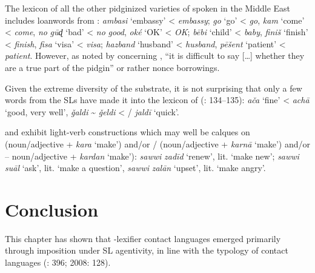 \documentclass[output=paper]{langsci/langscibook}
\begin{document}
  The lexicon of all the other pidginized varieties of  spoken in the Middle East includes {loanwords} from :  \textit{ambasi} `embassy' <  \textit{embassy}; \textit{go} `go' <  \textit{go}, \textit{kam} `come' <  \textit{come}, \textit{no} \textit{gūɖ} ‘bad’ <  \textit{no} \textit{good}, \textit{oké} `OK' <  \textit{OK};   \textit{bēbi} ‘child’ <  \textit{baby}, \textit{finiš} ‘finish’ <  \textit{finish}, \textit{fisa} ‘visa’ <  \textit{visa};  \textit{hazband} `husband' <  \textit{husband}, \textit{pēšent} ‘patient’ <  \textit{patient}. However, as noted by \citet[113]{Smart1990} concerning , “it is difficult to say […] whether they are a true part of the {pidgin}” or rather nonce borrowings.  

Given the extreme diversity of the {substrate}, it is not surprising that only a few words from the SLs have made it into the lexicon of  (\citealt{Avram2017article}: 134–135): \textit{ača} ‘fine’ <  \textit{achā} ‘good, very well’, \textit{ǧaldi} {\textasciitilde}  \textit{ǧeldi} < / \textit{jaldī} ‘quick’. 

  and  exhibit light-verb constructions which may well be calques on  (noun/adjective + \textit{kara} ‘make’) and/or / (noun/adjective + \textit{karnā} ‘make’) and/or  – noun/adjective + \textit{kardan} ‘make’):   \textit{sawwi} \textit{zadīd} ‘renew’, lit. ‘make new’;  \textit{sawwi} \textit{suāl} ‘ask’, lit. ‘make a question’, \textit{sawwi} \textit{zalān} ‘upset’, lit. ‘make angry’. 

\section{Conclusion}\label{sec:conc}

This chapter has shown that -{lexifier} contact languages emerged primarily through {imposition} under {SL} agentivity, in line with the typology of contact languages (\citealt{Winford2005}: 396; 2008: 128). 
\end{document}
